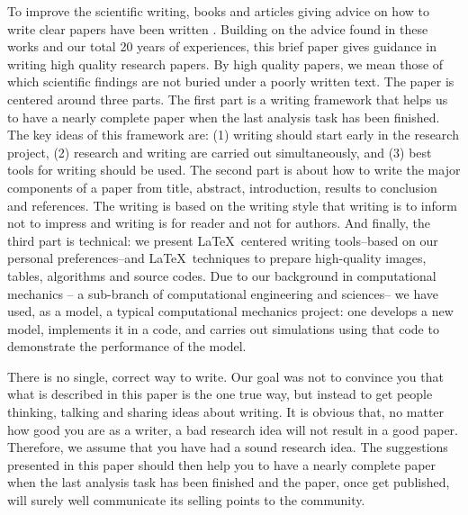 \documentclass[authoryear,12pta4paper,fleqn]{article}
\numberwithin{equation}{section}
\theoremstyle{remark}
\begin{document}
To improve the scientific writing, books and articles giving advice on how to write clear papers have been written \citep{white1972elements,day1998write,ashby2000write,plaxco2010art}. Building on the advice found in these works and our total 20 years of experiences, this brief paper gives guidance in writing high quality research papers. By high quality papers, we mean those of which scientific findings are not buried under a poorly written text. The paper is centered around three parts. 
The first part is a writing framework that helps us to have a nearly complete paper when the last analysis task has been finished.  The key ideas of this framework are: (1) writing should start early in the research project, (2) research and writing are carried out simultaneously, and (3) best tools for writing should be used.  The second part is about   how to  write the major components of a paper from title, abstract, introduction, results to conclusion and references. The writing is based on the writing style that writing is to inform not to impress and writing is for reader and not for authors. And  finally, the third part is technical:  we present \LaTeX\ centered writing tools--based on our personal preferences--and  \LaTeX\ techniques  to prepare high-quality images, tables, algorithms and source codes. Due to our background in computational mechanics -- a sub-branch of computational engineering and sciences-- we have used, as a model, a typical computational mechanics project: one develops a new model, implements it in a code, and carries out simulations using that code to demonstrate the performance of the model. 



There is no single, correct way to write.  Our goal was not to convince you that what is described in this paper is the one true way, but instead to get people thinking, talking and sharing ideas about writing. It is obvious that, no matter how good you are as a writer, a bad research idea will not result in a good paper. Therefore, we  assume that you have had a  sound research idea. The suggestions presented in this paper should then help you to have a nearly complete paper when the last analysis task has been finished and the paper, once get published, will surely well communicate its selling points to the community.
\end{document}
